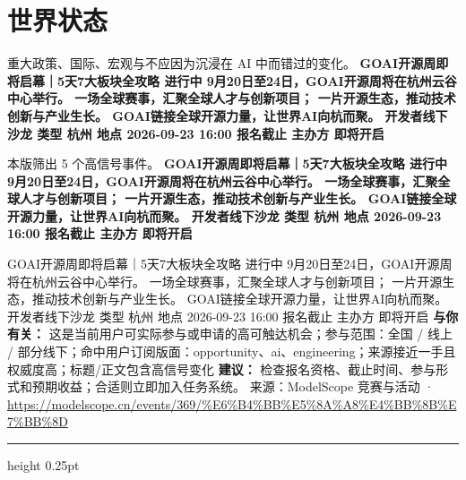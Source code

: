\documentclass[10.5pt]{ctexart}
\begin{document}
\section*{世界状态}
{\color{ormuted} 重大政策、国际、宏观与不应因为沉浸在 AI 中而错过的变化。}
\vspace{2mm}
{\LARGE\bfseries GOAI开源周即将启幕｜5天7大板块全攻略 进行中 9月20日至24日，GOAI开源周将在杭州云谷中心举行。 一场全球赛事，汇聚全球人才与创新项目； 一片开源生态，推动技术创新与产业生长。 GOAI链接全球开源力量，让世界AI向杭而聚。 开发者线下沙龙 类型 杭州 地点 2026-09-23 16:00 报名截止 主办方 即将开启}\par
\vspace{1mm}
{\color{ormuted} 本版筛出 5 个高信号事件。}
\vspace{3mm}
{\Large\bfseries GOAI开源周即将启幕｜5天7大板块全攻略 进行中 9月20日至24日，GOAI开源周将在杭州云谷中心举行。 一场全球赛事，汇聚全球人才与创新项目； 一片开源生态，推动技术创新与产业生长。 GOAI链接全球开源力量，让世界AI向杭而聚。 开发者线下沙龙 类型 杭州 地点 2026-09-23 16:00 报名截止 主办方 即将开启}\par
GOAI开源周即将启幕｜5天7大板块全攻略 进行中 9月20日至24日，GOAI开源周将在杭州云谷中心举行。 一场全球赛事，汇聚全球人才与创新项目； 一片开源生态，推动技术创新与产业生长。 GOAI链接全球开源力量，让世界AI向杭而聚。 开发者线下沙龙 类型 杭州 地点 2026-09-23 16:00 报名截止 主办方 即将开启
\textbf{与你有关：} 这是当前用户可实际参与或申请的高可触达机会；参与范围：全国 / 线上 / 部分线下；命中用户订阅版面：opportunity、ai、engineering；来源接近一手且权威度高；标题/正文包含高信号变化
\textbf{建议：} 检查报名资格、截止时间、参与形式和预期收益；合适则立即加入任务系统。
{\footnotesize\color{ormuted} 来源：ModelScope 竞赛与活动 · \url{https://modelscope.cn/events/369/%E6%B4%BB%E5%8A%A8%E4%BB%8B%E7%BB%8D}}
\vspace{4mm}
\hrule height 0.25pt
\vspace{3mm}
\end{document}
